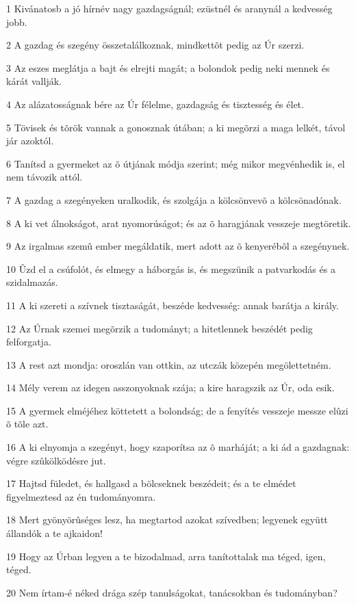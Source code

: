 \par 1 Kivánatosb a jó hírnév nagy gazdagságnál; ezüstnél és aranynál a kedvesség jobb.
\par 2 A gazdag és szegény összetalálkoznak, mindkettõt pedig az Úr szerzi.
\par 3 Az eszes meglátja a bajt és elrejti magát; a bolondok pedig neki mennek és kárát vallják.
\par 4 Az alázatosságnak bére az Úr félelme, gazdagság és tisztesség és élet.
\par 5 Tövisek és tõrök vannak a gonosznak útában; a ki megõrzi a maga lelkét, távol jár azoktól.
\par 6 Tanítsd a gyermeket az õ útjának módja szerint; még mikor megvénhedik is, el nem távozik attól.
\par 7 A gazdag a szegényeken uralkodik, és szolgája a kölcsönvevõ a kölcsönadónak.
\par 8 A ki vet álnokságot, arat nyomorúságot; és az õ haragjának vesszeje megtöretik.
\par 9 Az irgalmas szemû ember megáldatik, mert adott az õ kenyerébõl a szegénynek.
\par 10 Ûzd el a csúfolót, és elmegy a háborgás is, és megszünik a patvarkodás és a szidalmazás.
\par 11 A ki szereti a szívnek tisztaságát, beszéde kedvesség: annak barátja a király.
\par 12 Az Úrnak szemei megõrzik a tudományt; a hitetlennek beszédét pedig felforgatja.
\par 13 A rest azt mondja: oroszlán van ottkin, az utczák közepén megölettetném.
\par 14 Mély verem az idegen asszonyoknak szája; a kire haragszik az Úr, oda esik.
\par 15 A gyermek elméjéhez köttetett a bolondság; de a fenyítés vesszeje messze elûzi õ tõle azt.
\par 16 A ki elnyomja a szegényt, hogy szaporítsa az õ marháját; a ki ád a gazdagnak: végre szûkölködésre jut.
\par 17 Hajtsd füledet, és hallgasd a bölcseknek beszédeit; és a te elmédet figyelmeztesd az én tudományomra.
\par 18 Mert gyönyörûséges lesz, ha megtartod azokat szívedben; legyenek együtt állandók a te ajkaidon!
\par 19 Hogy az Úrban legyen a te bizodalmad, arra tanítottalak ma téged, igen, téged.
\par 20 Nem írtam-é néked drága szép tanulságokat, tanácsokban és tudományban?
